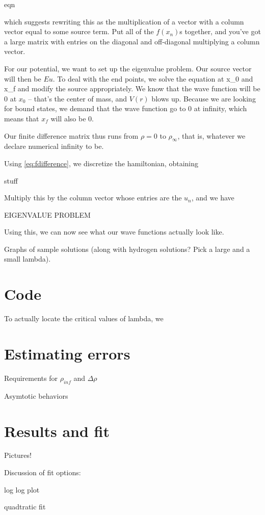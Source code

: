\documentclass[12pt,twoside]{reedthesis}
\begin{document}
eqn

which suggests rewriting this as the multiplication of a vector with a column vector equal to some source term. Put all of the $f(x_n)$s together, and you've got a large matrix with entries on the diagonal and off-diagonal multiplying a column vector.

For our potential, we want to set up the eigenvalue problem. Our source vector will then be $E u$. To deal with the end points, we solve the equation at x_0 and x_f and modify the source appropriately. We know that the wave function will be 0 at $x_0$ -- that's the center of mass, and $V(r)$ blows up. Because we are looking for bound states, we demand that the wave function go to 0 at infinity, which means that $x_f$ will also be 0. 

Our finite difference matrix thus runs from $\rho = 0$ to $\rho_{\infty}$, that is, whatever we declare numerical infinity to be. 

Using \eqref{eq:fdifference}, we discretize the hamiltonian, obtaining

stuff

Multiply this by the column vector whose entries are the $u_n$, and we have

EIGENVALUE PROBLEM

Using this, we can now see what our wave functions actually look like.

Graphs of sample solutions (along with hydrogen solutions? Pick a large and a small lambda).

\section{Code}
To actually locate the critical values of lambda, we 

\section{Estimating errors}
Requirements for $\rho_{inf}$ and $\Delta \rho$

Asymtotic behaviors

\section{Results and fit}
Pictures!

Discussion of fit options:

log log plot

quadtratic fit

\end{document}
